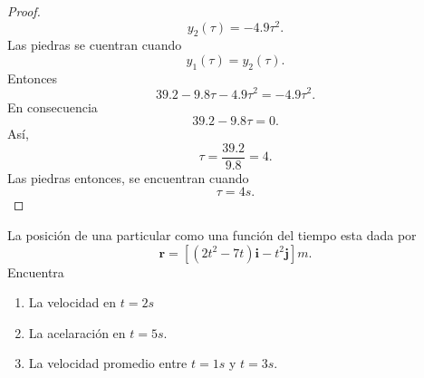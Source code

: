 \documentclass[12pt,a4paper]{article}
\begin{document}
\begin{proof}
\begin{equation*}
            y_{2}(\tau)=-4.9\tau^{2}.
        \end{equation*}
        Las piedras se cuentran cuando
        \begin{equation*}
            y_{1}(\tau)=y_{2}(\tau).
        \end{equation*}
        Entonces
        \begin{equation*}
            39.2-9.8\tau-4.9\tau^{2}=-4.9\tau^{2}.
        \end{equation*}
        En consecuencia
        \begin{equation*}
            39.2-9.8\tau=0.
        \end{equation*}
        Así,
        \begin{equation*}
            \tau=\frac{39.2}{9.8}=4.
        \end{equation*}
        Las piedras entonces, se encuentran cuando
        \begin{equation*}
            \tau=4s.
        \end{equation*}
    \end{proof}

    \begin{mdframed}[style=mdbluebox,frametitle={Ejercicio 3}]
        La posición de una particular como una función del tiempo esta dada por
        \begin{equation*}
            \textbf{r}=[(2t^{2}-7t)\textbf{i}-t^{2}\textbf{j}]m.
        \end{equation*}
        Encuentra
        \begin{enumerate}
            \item[(a)] La velocidad en $t=2s$
            \item[(b)] La acelaración en $t=5s$.
            \item[(c)] La velocidad promedio entre $t=1s$ y $t=3s$.  
        \end{enumerate}
    \end{mdframed}
\end{document}
